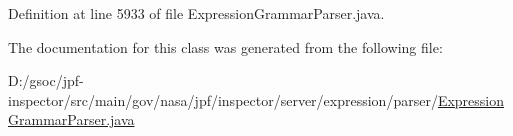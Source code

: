 Definition at line 5933 of file Expression\+Grammar\+Parser.\+java.



The documentation for this class was generated from the following file\+:\begin{DoxyCompactItemize}
\item 
D\+:/gsoc/jpf-\/inspector/src/main/gov/nasa/jpf/inspector/server/expression/parser/\hyperlink{_expression_grammar_parser_8java}{Expression\+Grammar\+Parser.\+java}\end{DoxyCompactItemize}

